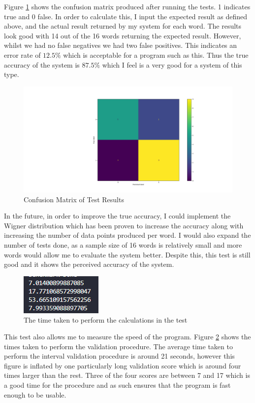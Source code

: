 \documentclass[10pt,a4paper]{report}
\begin{document}
Figure \ref{fig:ConfMat} shows the confusion matrix produced after running the tests. 1 indicates true and 0 false. In order to calculate this, I input the expected result as defined above, and the actual result returned by my system for each word. The results look good with 14 out of the 16 words returning the expected result. However, whilst we had no false negatives we had two false positives. This indicates an error rate of \(12.5\%\) which is acceptable for a program such as this. Thus the true accuracy of the system is \(87.5\%\) which I feel is a very good for a system of this type.
\begin{figure}
	\centering
	\includegraphics[scale=0.48]{ConfMatrixTest2}
	\caption{Confusion Matrix of Test Results}
	\label{fig:ConfMat}
\end{figure}

In the future, in order to improve the true accuracy, I could implement the Wigner distribution which has been proven to increase the accuracy along with increasing the number of data points produced per word. I would also expand the number of tests done, as a sample size of 16 words is relatively small and more words would allow me to evaluate the system better. Despite this, this test is still good and it shows the perceived accuracy of the system.

\begin{figure}
	\centering
	\includegraphics{Time}
	\caption{The time taken to perform the calculations in the test}
	\label{fig:Time}
\end{figure}

This test also allows me to measure the speed of the program. Figure \ref{fig:Time} shows the times taken to perform the validation procedure. The average time taken to perform the interval validation procedure is around 21 seconds, however this figure is inflated by one particularly long validation score which is around four times larger than the rest. Three of the four scores are between 7 and 17 which is a good time for the procedure and as such ensures that the program is fast enough to be usable.
\end{document}
